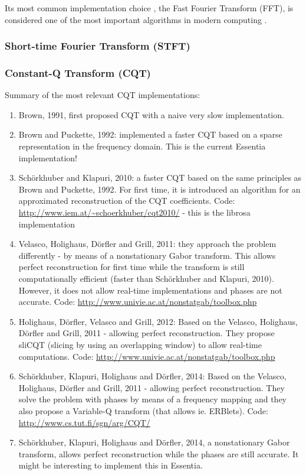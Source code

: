 \documentclass[report.tex]{subfiles}
\begin{document}
Its most common implementation choice , the Fast Fourier Transform (FFT), is considered one of the most important algorithms in modern computing .

\subsubsection{Short-time Fourier Transform (STFT)}

\subsubsection{Constant-Q Transform (CQT)}

Summary of the most relevant CQT implementations:

\begin{enumerate}
	\item
	    Brown, 1991, first proposed CQT with a naive very slow implementation.
    \item
	    Brown and Puckette, 1992: implemented a faster CQT based on a sparse representation in the frequency domain. This is the current Essentia implementation!
    \item
	    Sch{\"o}rkhuber and Klapuri, 2010: a faster CQT based on the same principles as Brown and Puckette, 1992. For first time, it is introduced an algorithm for an approximated reconstruction of the CQT coefficients. Code: \url{http://www.iem.at/~schoerkhuber/cqt2010/} - this is the librosa implementation
    \item
	    Velasco, Holighaus, D{\"o}rfler and Grill, 2011: they approach the problem differently - by means of a nonstationary Gabor transform. This allows perfect reconstruction for first time while the transform is still computationally efficient (faster than Sch{\"o}rkhuber and Klapuri, 2010). However, it does not allow real-time implementations and phases are not accurate. Code: \url{http://www.univie.ac.at/nonstatgab/toolbox.php}
    \item
	    Holighaus, D{\"o}rfler, Velasco and Grill, 2012: Based on the Velasco, Holighaus, Dörfler and Grill, 2011 - allowing perfect reconstruction. They propose sliCQT (slicing by using an overlapping window) to allow real-time computations. Code: \url{http://www.univie.ac.at/nonstatgab/toolbox.php}
    \item
	    Sch{\"o}rkhuber, Klapuri, Holighaus and Dörfler, 2014: Based on the Velasco, Holighaus, Dörfler and Grill, 2011 - allowing perfect reconstruction. They solve the problem with phases by means of a frequency mapping and they also propose a Variable-Q transform (that allows ie. ERBlets). Code: \url{http://www.cs.tut.fi/sgn/arg/CQT/}
    \item
	    Sch{\"o}rkhuber, Klapuri, Holighaus and D{\"o}rfler, 2014, a nonstationary Gabor transform, allows perfect reconstruction while the phases are still accurate. It might be interesting to implement this in Essentia.
\end{enumerate}
\end{document}
